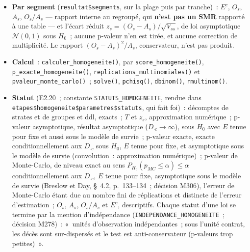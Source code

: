 \documentclass[a4paper,11pt]{article}
\newcommand{\code}[1]{\texttt{\small #1}}
\begin{document}
{\begin{itemize}[leftmargin=*, itemsep=2pt]
  \item \textbf{Par segment} (\code{resultat\$segments}, sur la plage puis
    par tranche)~: $E^c$, $O_s$, $A_s$, $O_s / A_s$ --- rapport interne au
    regroupé, qui \textbf{n'est pas un SMR} rapporté à une table --- et
    l'écart réduit $z_s = (O_s - A_s)/\sqrt{V_{ss}}$, de loi asymptotique
    $\mathcal{N}(0, 1)$ sous $H_0$~; aucune p-valeur n'en est tirée, et
    aucune correction de multiplicité. Le rapport $(O_s - A_s)^2/A_s$,
    conservateur, n'est pas produit.
  \item \textbf{Calcul}~: \code{calculer\_homogeneite()}, par
    \code{score\_homogeneite()}, \code{p\_exacte\_homogeneite()},
    \code{replications\_multinomiales()} et \code{pvaleur\_monte\_carlo()}~;
    \code{solve()}, \code{pchisq()}, \code{dbinom()}, \code{rmultinom()}.
  \item \textbf{Statut} (E2.20~; constante \code{STATUTS\_HOMOGENEITE},
    rendue dans \code{etapes\$homogeneite\$parametres\$statuts}, qui fait
    foi)~: décomptes de strates et de groupes et ddl, exacts~; $T$ et
    $z_s$, approximation numérique~; p-valeur asymptotique, résultat
    asymptotique ($D_{\cdot c} \to \infty$), sous $H_0$ avec $E$ tenue pour
    fixe et aussi sous le modèle de survie~; p-valeur exacte, exacte
    conditionnellement aux $D_{\cdot c}$ sous $H_0$, $E$ tenue pour fixe, et
    asymptotique sous le modèle de survie (convolution~: approximation
    numérique)~; p-valeur de Monte-Carlo, de niveau exact au sens
    $P_{H_0}(p_{MC} \le \alpha) \le \alpha$ conditionnellement aux
    $D_{\cdot c}$, $E$ tenue pour fixe, asymptotique sous le modèle de
    survie (Breslow et Day, §~4.2, p.~133--134~; décision M306), l'erreur
    de Monte-Carlo étant due au nombre fini de réplications et distincte de
    l'erreur d'estimation~; $O_s$, $A_s$, $O_s / A_s$ et $E^c$, descriptifs.
    Chaque statut d'une loi se termine par la mention d'indépendance
    (\code{INDEPENDANCE\_HOMOGENEITE}~; décision M278)~: «~unités
    d'observation indépendantes~; sous l'unité contrat, les décès sont
    sur-dispersés et le test est anti-conservateur (p-valeurs trop
    petites)~».
\end{itemize}\par}
\end{document}
